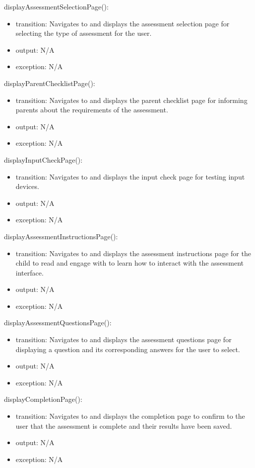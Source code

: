 \documentclass[12pt, titlepage]{article}
\begin{document}
\noindent displayAssessmentSelectionPage():
\begin{itemize}
\item transition: Navigates to and displays the assessment selection page for selecting the type of assessment for the user.
\item output: N/A
\item exception: N/A
\end{itemize}

\noindent displayParentChecklistPage():
\begin{itemize}
\item transition: Navigates to and displays the parent checklist page for informing parents about the requirements of the assessment.
\item output: N/A
\item exception: N/A
\end{itemize}

\noindent displayInputCheckPage():
\begin{itemize}
\item transition: Navigates to and displays the input check page for testing input devices.
\item output: N/A
\item exception: N/A
\end{itemize}

\noindent displayAssessmentInstructionsPage():
\begin{itemize}
\item transition: Navigates to and displays the assessment instructions page for the child to read and engage with to learn how to interact with the assessment interface.
\item output: N/A
\item exception: N/A
\end{itemize}

\noindent displayAssessmentQuestionsPage():
\begin{itemize}
\item transition: Navigates to and displays the assessment questions page for displaying a question and its corresponding answers for the user to select.
\item output: N/A
\item exception: N/A
\end{itemize}

\noindent displayCompletionPage():
\begin{itemize}
\item transition: Navigates to and displays the completion page to confirm to the user that the assessment is complete and their results have been saved.
\item output: N/A
\item exception: N/A
\end{itemize}
\end{document}
